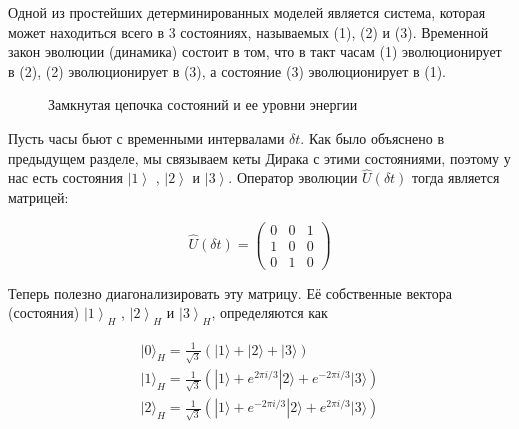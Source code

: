 \documentclass[main.tex]{subfiles}
\begin{document}
Одной из простейших детерминированных моделей является система, которая может находиться всего в 3 состояниях, называемых (1), (2) и (3). Временной закон эволюции (динамика) состоит в том, что в такт часам (1) эволюционирует в (2), (2) эволюционирует в (3), а состояние (3) эволюционирует в (1). 

\begin{figure}[ht] %
\begin{center}
\caption{
\label{i2.1}Замкнутая цепочка состояний и ее уровни энергии}
\end {center}
\end {figure}

Пусть часы бьют с временными интервалами $\delta t$. Как было объяснено в предыдущем разделе, мы связываем кеты Дирака с этими состояниями, поэтому у нас есть состояния $\left|1\right>$ , $\left|2\right>$ и $\left|3\right>$. Оператор эволюции $\hat U(\delta t)$ тогда является матрицей:

\begin{equation}\label{2.13}
	\hat U(\delta t)=\left(\begin{array}{lll}{0} & {0} & {1} \\ {1} & {0} & {0} \\ {0} & {1} & {0}\end{array}\right)
\end{equation}

Теперь полезно диагонализировать эту матрицу. Её собственные вектора (состояния) $\left|1\right>_H$ , $\left|2\right>_H$ и $\left|3\right>_H$, определяются как

\begin{equation}\label{2.14}
	\begin{array}{l}{|0\rangle_{H}=\frac{1}{\sqrt{3}}(|1\rangle+|2\rangle+|3\rangle)} \\ {|1\rangle_{H}=\frac{1}{\sqrt{3}}\left(|1\rangle+ e^{2 \pi i / 3}|2\rangle+ e^{-2 \pi i / 3}|3\rangle\right)} \\ {|2\rangle_{H}=\frac{1}{\sqrt{3}}\left(|1\rangle+ e^{-2 \pi i / 3}|2\rangle+ e^{2 \pi i / 3}|3\rangle\right)}\end{array}
\end{equation}
\end{document}

